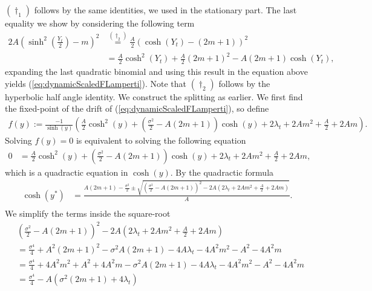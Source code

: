 $(\dagger_1)$ follows by the same identities, we used in the stationary part. The last equality we show by considering the following term
\begin{align*}
    2A\left(\sinh^2\left(\frac{Y_t}{2}\right) - m\right)^2 &\overset{(\dagger_2)}{=} \frac{A}{2}\left(\cosh(Y_t) - \left(2m + 1\right)\right)^2 \\
    &= \frac{A}{2}\cosh^2(Y_t) + \frac{A}{2}\left(2m +1\right)^2 - A\left(2m + 1\right)\cosh(Y_t),
\end{align*}
expanding the last quadratic binomial and using this result in the equation above yields (\ref{eq:dynamicScaledFLamperti}). Note that $(\dagger_2)$ follows by the hyperbolic half angle identity.
We construct the splitting as earlier. We first find the fixed-point of the drift of (\ref{eq:dynamicScaledFLamperti}), so define
\begin{align}
    f(y) := \frac{-1}{\sinh\left(y\right)}\left(\frac{A}{2}\cosh^2\left(y\right) + \left(\frac{\sigma^2}{2} - A \left(2m + 1\right)\right)\cosh\left(y\right) + 2\lambda_t + 2Am^2 + \frac{A}{2} + 2Am\right). \nonumber
\end{align}
Solving $f(y) = 0$ is equivalent to solving the following equation
\begin{align}
    0 &= \frac{A}{2}\cosh^2\left(y\right) + \left(\frac{\sigma^2}{2} - A \left(2m + 1\right)\right)\cosh\left(y\right) + 2\lambda_t + 2Am^2 + \frac{A}{2} + 2Am,
\end{align}
which is a quadractic equation in $\cosh(y)$. By the quadractic formula
\begin{align}
    \cosh(y^*) &= \frac{A\left(2m + 1\right) - \frac{\sigma^2}{2} \pm \sqrt{\left(\frac{\sigma^2}{2} - A \left(2m + 1\right)\right)^2 - 2A\left(2\lambda_t + 2Am^2 + \frac{A}{2} + 2Am\right)}}{A}.\nonumber\\
\end{align}
We simplify the terms inside the square-root
\begin{align*}
    &\left(\frac{\sigma^2}{2} - A \left(2m + 1\right)\right)^2 - 2A\left(2\lambda_t + 2Am^2 + \frac{A}{2} + 2Am\right)\\
    &=\frac{\sigma^4}{4} + A^2\left(2m + 1\right)^2 -\sigma^2A\left(2m+1\right) - 4A\lambda_t - 4A^2m^2 - A^2 - 4A^2m\\
    &= \frac{\sigma^4}{4} + 4A^2m^2 + A^2 +4A^2m - \sigma^2A\left(2m + 1\right) - 4A\lambda_t - 4A^2m^2 - A^2 - 4A^2m \\
    &=\frac{\sigma^4}{4} - A\left(\sigma^2\left(2m + 1\right) + 4\lambda_t\right)
\end{align*}
